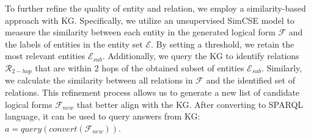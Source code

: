 To further refine the quality of entity and relation, we employ a similarity-based approach with KG. Specifically, we utilize an unsupervised SimCSE model to measure the similarity between each entity in the generated logical form $\mathcal{F}$ and the labels of entities in the entity set $\mathcal{E}$. By setting a threshold, we retain the most relevant entities $\mathcal{E}_{sub}$. Additionally, we query the KG to identify relations $\mathcal{R}_{2-hop}$ that are within 2 hops of the obtained subset of entities $\mathcal{E}_{sub}$. Similarly, we calculate the similarity between all relations in $\mathcal{F}$ and the identified set of relations. This refinement process allows us to generate a new list of candidate logical forms $\mathcal{F}_{new}$ that better align with the KG. After converting to SPARQL language, it can be used to query answers from KG: $a = query(convert(\mathcal{F}_{new}))$. 

